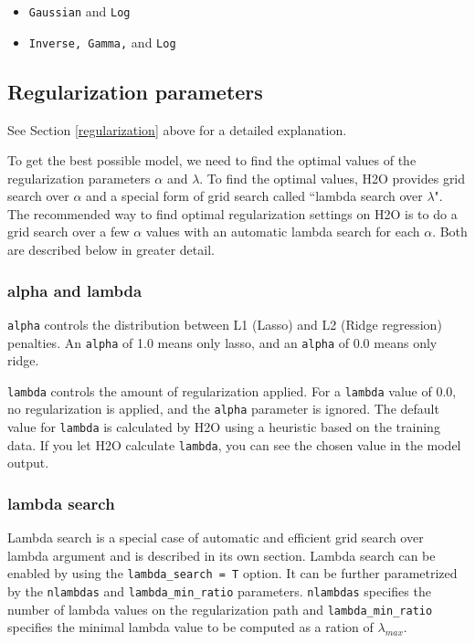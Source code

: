 \begin{itemize}
\item \texttt{Gaussian} and \texttt{Log}
\item \texttt{Inverse, Gamma,} and \texttt{Log}
\end{itemize} 

\subsection{Regularization parameters}

See Section \ref{regularization} above for a detailed explanation.

To get the best possible model, we need to find the optimal values of the regularization parameters $\alpha$ and
$\lambda$.  To find the optimal values, H2O provides grid search over $\alpha$ and a special form of grid search
called ``lambda search over $\lambda$". The recommended way to find optimal regularization settings on H2O is to do
a grid search over a few $\alpha$ values with an automatic lambda search for each $\alpha$. Both are described
below in greater detail.

\subsubsection{alpha and lambda}

\texttt{alpha} controls the distribution between L1 (Lasso) and L2 (Ridge regression) penalties.  An \texttt{alpha} 
of 1.0 means only lasso, and an \texttt{alpha} of 0.0 means only ridge.

\texttt{lambda} controls the amount of regularization applied.  For a \texttt{lambda} value of 0.0, no 
regularization is applied, and the \texttt{alpha} parameter is ignored.  The default value for \texttt{lambda} is
calculated by H2O using a heuristic based on the training data.  If you let H2O calculate \texttt{lambda}, you can
see the chosen value in the model output.

\subsubsection{lambda search}

Lambda search is a special case of automatic and efficient grid search over lambda argument and is described in its
own section. Lambda search can be enabled by using the \texttt{lambda\_search = T} option. It can be further
parametrized by the \texttt{nlambdas} and \texttt{lambda\_min\_ratio} parameters.
\texttt{nlambdas} specifies the number of lambda values on the regularization path and \texttt{lambda\_min\_ratio} 
specifies the minimal lambda value to be computed as a ration of $\lambda_{max}$.

